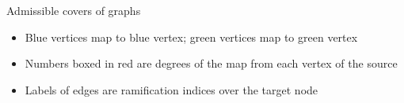 \documentclass{beamer}
\theoremstyle{definition}
\begin{document}
\begin{frame}{Admissible covers of graphs}

                                      \begin{itemize}
                                      \item Blue vertices map to blue vertex; green vertices map to green vertex
                                      \item Numbers boxed in red are degrees of the map from each vertex of the source
                                        \item Labels of edges are ramification indices over the target node
                                        \end{itemize}
                                                                                                                                                                                                                          \end{frame}
\end{document}

